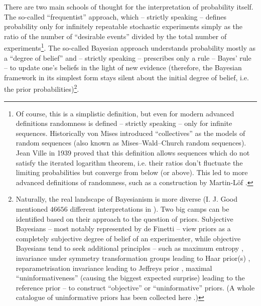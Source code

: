 \documentclass{article}
\begin{document}
There are two main schools of thought for the interpretation of probability itself. The so-called ``frequentist'' approach, which -- strictly speaking -- defines probability only for infinitely repeatable stochastic experiments simply as the ratio of the number of ``desirable events'' divided by the total number of experiments\footnote{Of course, this is a simplistic definition, but even for modern advanced definitions randomness is defined -- strictly speaking -- only for infinite sequences. Historically von Mises introduced ``collectives'' \cite{book:VonMises} as the models of random sequences (also known as Mises–Wald–Church random sequences). Jean Ville in 1939 proved \cite{book:ProbabilityAndFinanceGame,thesis:Ville1939} that this definition allows sequences which do not satisfy the iterated logarithm theorem, i.e. their ratios don't fluctuate the limiting probabilities but converge from below (or above). This led to more advanced definitions of randomness, such as a construction by Martin-Löf \cite{book:KnuthVol2,paper:MartinLof1966}.}. The so-called Bayesian approach understands probability mostly as a ``degree of belief'' and -- strictly speaking -- prescribes only a rule -- Bayes' rule -- to update one's beliefs in the light of new evidence (therefore, the Bayesian framework in its simplest form stays silent about the initial degree of belief, i.e. the prior probabilities)\footnote{Naturally, the real landscape of Bayesianism is more diverse (I. J. Good mentioned $46656$ different interpretations in \cite{book:GoodThinking}). Two big camps can be identified based on their approach to the question of priors. Subjective Bayesians -- most notably represented by de Finetti \cite{book:deFinetti} -- view priors as a completely subjective degree of belief of an experimenter, while objective Bayesians \cite{book:ObjectiveBayesianInference} tend to seek additional principles -- such as maximum entropy \cite{book:Jaynes,paper:GameTheoryMaximumEntropyGrunwald2004}, invariance under symmetry transformation groups leading to Haar prior(s) \cite{book:Jaynes,book:ObjectiveBayesianInference}, reparametrisation invariance leading to Jeffreys prior \cite{paper:JeffreysPriorOriginal}, maximal ``uninformativeness'' (causing the biggest expected surprise) leading to the reference prior \cite{book:Bernardo} -- to construct ``objective'' or ``uninformative'' priors. (A whole catalogue of uninformative priors has been collected here \cite{misc:PriorCatalog}.)}.
\end{document}
